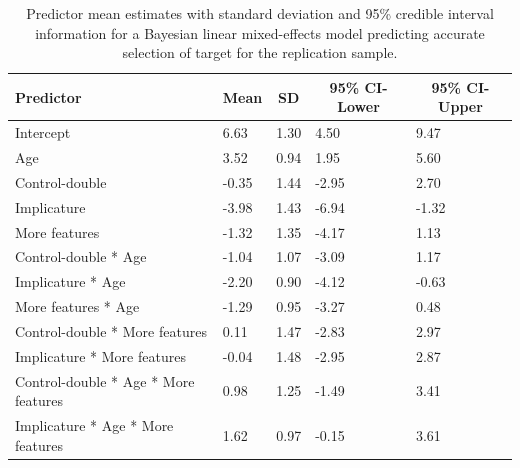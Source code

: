 \documentclass[man]{apa6}
\begin{document}
\begin{table}[tbp]
\begin{center}
\begin{threeparttable}
\caption{\label{tab:brmaccSample2}Predictor mean estimates with standard deviation and 95\% credible interval information for a Bayesian linear mixed-effects model predicting accurate selection of target for the replication sample.}
\begin{tabular}{lllll}
\toprule
Predictor & \multicolumn{1}{c}{Mean} & \multicolumn{1}{c}{SD} & \multicolumn{1}{c}{95\% CI-Lower} & \multicolumn{1}{c}{95\% CI-Upper}\\
\midrule
Intercept & 6.63 & 1.30 & 4.50 & 9.47\\
Age & 3.52 & 0.94 & 1.95 & 5.60\\
Control-double & -0.35 & 1.44 & -2.95 & 2.70\\
Implicature & -3.98 & 1.43 & -6.94 & -1.32\\
More features & -1.32 & 1.35 & -4.17 & 1.13\\
Control-double * Age & -1.04 & 1.07 & -3.09 & 1.17\\
Implicature * Age & -2.20 & 0.90 & -4.12 & -0.63\\
More features * Age & -1.29 & 0.95 & -3.27 & 0.48\\
Control-double * More features & 0.11 & 1.47 & -2.83 & 2.97\\
Implicature * More features & -0.04 & 1.48 & -2.95 & 2.87\\
Control-double * Age * More features & 0.98 & 1.25 & -1.49 & 3.41\\
Implicature * Age * More features & 1.62 & 0.97 & -0.15 & 3.61\\
\bottomrule
\end{tabular}
\end{threeparttable}
\end{center}
\end{table}
\end{document}

